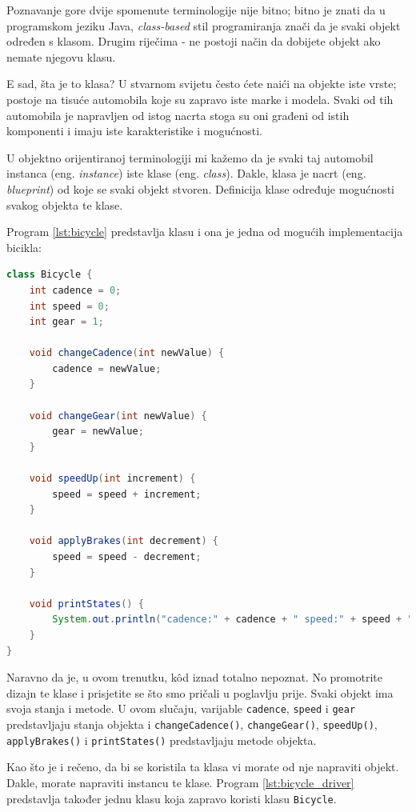 Poznavanje gore dvije spomenute terminologije nije bitno; bitno je znati da u programskom jeziku Java, \emph{class-based} stil programiranja znači da je svaki objekt određen s klasom. Drugim riječima - ne postoji način da dobijete objekt ako nemate njegovu klasu.

E sad, šta je to klasa? U stvarnom svijetu često ćete naići na objekte iste vrste; postoje na tisuće automobila koje su zapravo iste marke i modela. Svaki od tih automobila je napravljen od istog nacrta stoga su oni građeni od istih komponenti i imaju iste karakteristike i mogućnosti.

U objektno orijentiranoj terminologiji mi kažemo da je svaki taj automobil instanca (eng. \emph{instance}) iste klase (eng. \emph{class}). Dakle, klasa je nacrt (eng. \emph{blueprint}) od koje se svaki objekt stvoren. Definicija klase određuje mogućnosti svakog objekta te klase.

Program \ref{lst:bicycle} predstavlja klasu i ona je jedna od mogućih implementacija bicikla:~\cite{javatutorials}

\begin{lstlisting}[language=java, caption=Bicycle, label=lst:bicycle]
class Bicycle {
    int cadence = 0;
    int speed = 0;
    int gear = 1;
    
    void changeCadence(int newValue) {
        cadence = newValue;
    }
    
    void changeGear(int newValue) {
        gear = newValue;
    }
    
    void speedUp(int increment) {
        speed = speed + increment;
    }
    
    void applyBrakes(int decrement) {
        speed = speed - decrement;
    }
    
    void printStates() {
        System.out.println("cadence:" + cadence + " speed:" + speed + " gear:" + gear);
    }
}
\end{lstlisting}

Naravno da je, u ovom trenutku, kôd iznad totalno nepoznat. No promotrite dizajn te klase i prisjetite se što smo pričali u poglavlju prije. Svaki objekt ima svoja stanja i metode. U ovom slučaju, varijable \texttt{cadence}, \texttt{speed} i \texttt{gear} predstavljaju stanja objekta i \texttt{changeCadence()}, \texttt{changeGear()}, \texttt{speedUp()}, \texttt{applyBrakes()} i \texttt{printStates()} predstavljaju metode objekta.

Kao što je i rečeno, da bi se koristila ta klasa vi morate od nje napraviti objekt. Dakle, morate napraviti instancu te klase. Program \ref{lst:bicycle_driver} predstavlja također jednu klasu koja zapravo koristi klasu \texttt{Bicycle}.~\cite{javatutorials}


